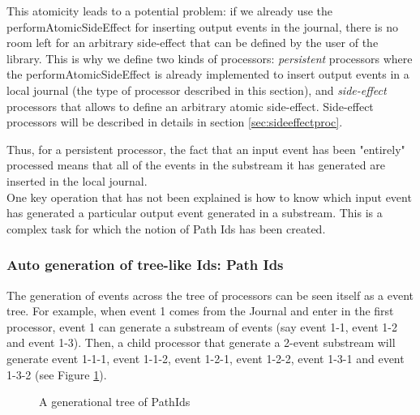 This atomicity leads to a potential problem: if we already use the performAtomicSideEffect for inserting output events in the journal, there is no room left for an arbitrary side-effect that can be defined by the user of the library. This is why we define two kinds of processors: \textit{persistent} processors where the performAtomicSideEffect is already implemented to insert output events in a local journal (the type of processor described in this section), and \textit{side-effect} processors that allows to define
an arbitrary atomic side-effect. Side-effect processors will be described in details in section \ref{sec:sideeffectproc}.

Thus, for a persistent processor, the fact that an input event has been "entirely" processed means that all of the events in the substream it has generated are inserted in the local journal.
\\

One key operation that has not been explained is how to know which input event has generated a particular output event generated in a substream. This is a complex task for which the notion of Path Ids has been created.

\subsubsection{Auto generation of tree-like Ids: Path Ids}

The generation of events across the tree of processors can be seen itself as a event tree. For example, when event 1 comes from the Journal and enter in the first
processor, event 1 can generate a substream of events (say event 1-1, event 1-2 and event 1-3). Then, a child processor that generate a 2-event substream
will generate event 1-1-1, event 1-1-2, event 1-2-1, event 1-2-2, event 1-3-1 and event 1-3-2 (see Figure \ref{fig:treepathid}).

\begin{figure}[h]
  \begin{center} 
    \caption{A generational tree of PathIds}
    \label{fig:treepathid}
  \end{center}
\end{figure}

